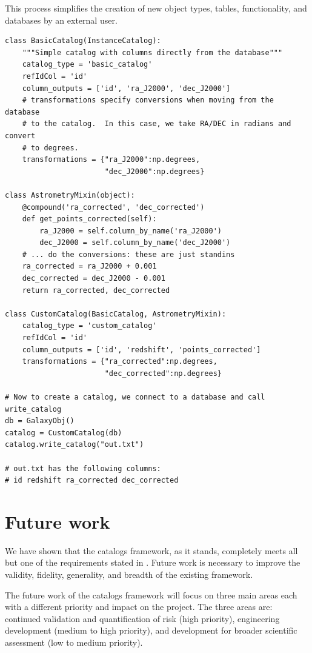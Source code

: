 \documentclass[11pt]{article}
\begin{document}
This process simplifies the creation of new object types, tables,
functionality, and databases by an external user. 

\begin{verbatim}
class BasicCatalog(InstanceCatalog):
    """Simple catalog with columns directly from the database"""
    catalog_type = 'basic_catalog'
    refIdCol = 'id'
    column_outputs = ['id', 'ra_J2000', 'dec_J2000']
    # transformations specify conversions when moving from the database
    # to the catalog.  In this case, we take RA/DEC in radians and convert
    # to degrees.
    transformations = {"ra_J2000":np.degrees,
                       "dec_J2000":np.degrees}

class AstrometryMixin(object):
    @compound('ra_corrected', 'dec_corrected')
    def get_points_corrected(self):
        ra_J2000 = self.column_by_name('ra_J2000')
        dec_J2000 = self.column_by_name('dec_J2000')
    # ... do the conversions: these are just standins
    ra_corrected = ra_J2000 + 0.001
    dec_corrected = dec_J2000 - 0.001
    return ra_corrected, dec_corrected

class CustomCatalog(BasicCatalog, AstrometryMixin):
    catalog_type = 'custom_catalog'
    refIdCol = 'id'
    column_outputs = ['id', 'redshift', 'points_corrected']
    transformations = {"ra_corrected":np.degrees,
                       "dec_corrected":np.degrees}

# Now to create a catalog, we connect to a database and call write_catalog
db = GalaxyObj()
catalog = CustomCatalog(db)
catalog.write_catalog("out.txt")

# out.txt has the following columns:
# id redshift ra_corrected dec_corrected
\end{verbatim}


\section{Future work}
We have shown that the catalogs framework, as it stands, completely meets all but one of the requirements stated in \citet{requirements}.  Future
work is necessary to improve the validity, fidelity, generality, and breadth of the existing framework.

The future work of the catalogs framework will focus on three main areas each with a different priority and impact on the project.  The three
areas are: continued validation and quantification of risk (high priority), engineering development (medium to high priority), and development for
broader scientific assessment (low to medium priority).
\end{document}

